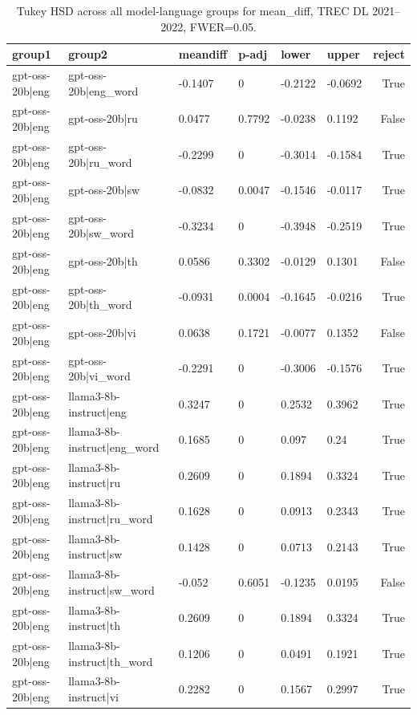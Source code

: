 \begin{table}
\caption{Tukey HSD across all model-language groups for mean_diff, TREC DL 2021--2022, FWER=0.05.}
\label{tab:tukey_all_models_all_langs_2021_2022_mean_diff}
\begin{tabular}{llllllr}
\toprule
group1 & group2 & meandiff & p-adj & lower & upper & reject \\
\midrule
gpt-oss-20b|eng & gpt-oss-20b|eng_word & -0.1407 & 0 & -0.2122 & -0.0692 & True \\
gpt-oss-20b|eng & gpt-oss-20b|ru & 0.0477 & 0.7792 & -0.0238 & 0.1192 & False \\
gpt-oss-20b|eng & gpt-oss-20b|ru_word & -0.2299 & 0 & -0.3014 & -0.1584 & True \\
gpt-oss-20b|eng & gpt-oss-20b|sw & -0.0832 & 0.0047 & -0.1546 & -0.0117 & True \\
gpt-oss-20b|eng & gpt-oss-20b|sw_word & -0.3234 & 0 & -0.3948 & -0.2519 & True \\
gpt-oss-20b|eng & gpt-oss-20b|th & 0.0586 & 0.3302 & -0.0129 & 0.1301 & False \\
gpt-oss-20b|eng & gpt-oss-20b|th_word & -0.0931 & 0.0004 & -0.1645 & -0.0216 & True \\
gpt-oss-20b|eng & gpt-oss-20b|vi & 0.0638 & 0.1721 & -0.0077 & 0.1352 & False \\
gpt-oss-20b|eng & gpt-oss-20b|vi_word & -0.2291 & 0 & -0.3006 & -0.1576 & True \\
gpt-oss-20b|eng & llama3-8b-instruct|eng & 0.3247 & 0 & 0.2532 & 0.3962 & True \\
gpt-oss-20b|eng & llama3-8b-instruct|eng_word & 0.1685 & 0 & 0.097 & 0.24 & True \\
gpt-oss-20b|eng & llama3-8b-instruct|ru & 0.2609 & 0 & 0.1894 & 0.3324 & True \\
gpt-oss-20b|eng & llama3-8b-instruct|ru_word & 0.1628 & 0 & 0.0913 & 0.2343 & True \\
gpt-oss-20b|eng & llama3-8b-instruct|sw & 0.1428 & 0 & 0.0713 & 0.2143 & True \\
gpt-oss-20b|eng & llama3-8b-instruct|sw_word & -0.052 & 0.6051 & -0.1235 & 0.0195 & False \\
gpt-oss-20b|eng & llama3-8b-instruct|th & 0.2609 & 0 & 0.1894 & 0.3324 & True \\
gpt-oss-20b|eng & llama3-8b-instruct|th_word & 0.1206 & 0 & 0.0491 & 0.1921 & True \\
gpt-oss-20b|eng & llama3-8b-instruct|vi & 0.2282 & 0 & 0.1567 & 0.2997 & True \\

\end{tabular}
\end{table}
